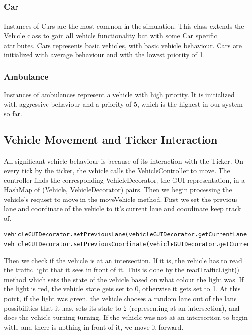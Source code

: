 \documentclass[a4paper,11pt,titlepage]{article}
\begin{document}
\subsubsection{Car}
\paragraph{}
Instances of Cars are the most common in the simulation. This class extends the Vehicle class to gain all vehicle functionality but with some Car specific attributes. Cars represents basic vehicles, with basic vehicle behaviour. Cars are initialized with average behaviour and with the lowest priority of 1.
\subsubsection{Ambulance}
Instances of ambulances represent a vehicle with high priority. It is initialized with aggressive behaviour and a priority of 5, which is the highest in our system so far.
\subsection{Vehicle Movement and Ticker Interaction}
\paragraph{}
All significant vehicle behaviour is because of its interaction with the Ticker. On every tick by the ticker, the vehicle calls the VehicleController to move. The controller finds the corresponding VehicleDecorator, the GUI representation, in a HashMap of (Vehicle, VehicleDecorator) pairs. Then we begin processing the vehicle's request to move in the moveVehicle method. First we set the previous lane and coordinate of the vehicle to it's current lane and coordinate keep track of.
\begin{lstlisting}
vehicleGUIDecorator.setPreviousLane(vehicleGUIDecorator.getCurrentLane());
vehicleGUIDecorator.setPreviousCoordinate(vehicleGUIDecorator.getCurrentCoordinate());
\end{lstlisting}
Then we check if the vehicle is at an intersection. If it is, the vehicle has to read the traffic light that it sees in front of it. This is done by the readTrafficLight() method which sets the state of the vehicle based on what colour the light was. If the light is red, the vehicle state gets set to 0, otherwise it gets set to 1. At this point, if the light was green, the vehicle chooses a random lane out of the lane possibilities that it has, sets its state to 2 (representing at an intersection), and does the vehicle turning turning. If the vehicle was not at an intersection to begin with, and there is nothing in front of it, we move it forward. 
\end{document}
